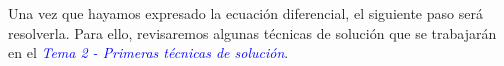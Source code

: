 \documentclass[12pt]{article}
\numberwithin{equation}{section}
\begin{document}
Una vez que hayamos expresado la ecuación diferencial, el siguiente paso será resolverla. Para ello, revisaremos algunas técnicas de solución que se trabajarán en el \emph{\textcolor{blue}{Tema 2 - Primeras técnicas de solución}}.


\end{document}
